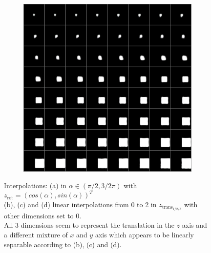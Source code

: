 \documentclass[10pt,a4paper]{article}
\newcommand{\rot}{\ensuremath{\text{rot}\xspace}}
\newcommand{\trans}{\ensuremath{\text{trans}\xspace}}
\begin{document}
\begin{figure}[!ht]
\begin{subfigure}{0.49\textwidth}
	\caption{}
	\label{fig1:subim3}
\end{subfigure}
\begin{subfigure}{0.49\textwidth}
	\centering	
	\includegraphics[width=\textwidth] {square_interpolation_z.png}
	\caption{}
	\label{fig1:subim4}
\end{subfigure}
\caption{Interpolations: (a) in $\alpha \in (\pi /2, 3/2 \pi)$ with $z_{\rot}= (cos(\alpha), sin(\alpha))^T$\\
(b), (c) and (d) linear interpolations from 0 to 2 in $z_{\trans_{1/2/3}}$ with other dimensions set to 0.\\
All 3 dimensions seem to represent the translation in the $z$ axis and a different mixture of $x$ and $y$ axis which appears to be linearly separable according to (b), (c) and (d).} \label{square_ipol}
\end{figure}
\newpage
\end{document}
